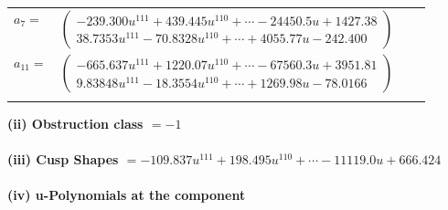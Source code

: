 \documentclass[1p]{elsarticle_modified}
\theoremstyle{definition}
\begin{document}
\begin{tabular}{m{7pt} m{180pt} m{7pt} m{180pt} }
\flushright $a_{7}=$&$\begin{pmatrix}-239.300 u^{111}+439.445 u^{110}+\cdots-24450.5 u+1427.38\\38.7353 u^{111}-70.8328 u^{110}+\cdots+4055.77 u-242.400\end{pmatrix}$ \\
\flushright $a_{11}=$&$\begin{pmatrix}-665.637 u^{111}+1220.07 u^{110}+\cdots-67560.3 u+3951.81\\9.83848 u^{111}-18.3554 u^{110}+\cdots+1269.98 u-78.0166\end{pmatrix}$\\&\end{tabular}
\flushleft \textbf{(ii) Obstruction class $= -1$}\\~\\
\flushleft \textbf{(iii) Cusp Shapes $= -109.837 u^{111}+198.495 u^{110}+\cdots-11119.0 u+666.424$}\\~\\
\newpage\renewcommand{\arraystretch}{1}
\flushleft \textbf{(iv) u-Polynomials at the component}\newline \\
\end{document}
